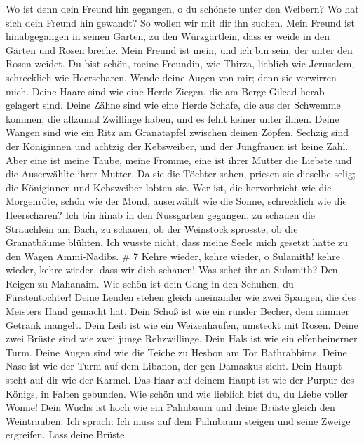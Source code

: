 Wo ist denn dein Freund hin gegangen, o du schönste unter den Weibern?
Wo hat sich dein Freund hin gewandt? So wollen wir mit dir ihn suchen.
 Mein Freund ist hinabgegangen in seinen Garten, zu den
Würzgärtlein, dass er weide in den Gärten und Rosen breche. 
Mein Freund ist mein, und ich bin sein, der unter den Rosen weidet.
 Du bist schön, meine Freundin, wie Thirza, lieblich wie
Jerusalem, schrecklich wie Heerscharen.  Wende deine Augen
von mir; denn sie verwirren mich. Deine Haare sind wie eine Herde
Ziegen, die am Berge Gilead herab gelagert sind.  Deine
Zähne sind wie eine Herde Schafe, die aus der Schwemme kommen, die
allzumal Zwillinge haben, und es fehlt keiner unter ihnen. 
Deine Wangen sind wie ein Ritz am Granatapfel zwischen deinen Zöpfen.
 Sechzig sind der Königinnen und achtzig der Kebsweiber, und
der Jungfrauen ist keine Zahl.  Aber eine ist meine Taube,
meine Fromme, eine ist ihrer Mutter die Liebste und die Auserwählte
ihrer Mutter. Da sie die Töchter sahen, priesen sie dieselbe selig; die
Königinnen und Kebsweiber lobten sie.  Wer ist, die
hervorbricht wie die Morgenröte, schön wie der Mond, auserwählt wie die
Sonne, schrecklich wie die Heerscharen?  Ich bin hinab in
den Nussgarten gegangen, zu schauen die Sträuchlein am Bach, zu schauen,
ob der Weinstock sprosste, ob die Granatbäume blühten.  Ich
wusste nicht, dass meine Seele mich gesetzt hatte zu den Wagen
Ammi-Nadibs. \# 7  Kehre wieder, kehre wieder, o Sulamith!
kehre wieder, kehre wieder, dass wir dich schauen! Was sehet ihr an
Sulamith? Den Reigen zu Mahanaim.  Wie schön ist dein Gang
in den Schuhen, du Fürstentochter! Deine Lenden stehen gleich aneinander
wie zwei Spangen, die des Meisters Hand gemacht hat.  Dein
Schoß ist wie ein runder Becher, dem nimmer Getränk mangelt. Dein Leib
ist wie ein Weizenhaufen, umsteckt mit Rosen.  Deine zwei
Brüste sind wie zwei junge Rehzwillinge.  Dein Hals ist wie
ein elfenbeinerner Turm. Deine Augen sind wie die Teiche zu Hesbon am
Tor Bathrabbims. Deine Nase ist wie der Turm auf dem Libanon, der gen
Damaskus sieht.  Dein Haupt steht auf dir wie der Karmel.
Das Haar auf deinem Haupt ist wie der Purpur des Königs, in Falten
gebunden.  Wie schön und wie lieblich bist du, du Liebe
voller Wonne!  Dein Wuchs ist hoch wie ein Palmbaum und
deine Brüste gleich den Weintrauben.  Ich sprach: Ich muss
auf dem Palmbaum steigen und seine Zweige ergreifen. Lass deine Brüste
